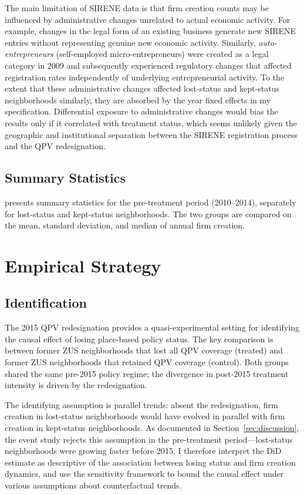 \documentclass[12pt]{article}
\begin{document}
The main limitation of SIRENE data is that firm creation counts may be influenced by administrative changes unrelated to actual economic activity. For example, changes in the legal form of an existing business generate new SIRENE entries without representing genuine new economic activity. Similarly, \textit{auto-entrepreneurs} (self-employed micro-entrepreneurs) were created as a legal category in 2009 and subsequently experienced regulatory changes that affected registration rates independently of underlying entrepreneurial activity. To the extent that these administrative changes affected lost-status and kept-status neighborhoods similarly, they are absorbed by the year fixed effects in my specification. Differential exposure to administrative changes would bias the results only if it correlated with treatment status, which seems unlikely given the geographic and institutional separation between the SIRENE registration process and the QPV redesignation.

\subsection{Summary Statistics}

 presents summary statistics for the pre-treatment period (2010--2014), separately for lost-status and kept-status neighborhoods. The two groups are compared on the mean, standard deviation, and median of annual firm creation.




\section{Empirical Strategy}

\subsection{Identification}

The 2015 QPV redesignation provides a quasi-experimental setting for identifying the causal effect of losing place-based policy status. The key comparison is between former ZUS neighborhoods that lost all QPV coverage (treated) and former ZUS neighborhoods that retained QPV coverage (control). Both groups shared the same pre-2015 policy regime; the divergence in post-2015 treatment intensity is driven by the redesignation.

The identifying assumption is parallel trends: absent the redesignation, firm creation in lost-status neighborhoods would have evolved in parallel with firm creation in kept-status neighborhoods. As documented in Section~\ref{sec:discussion}, the event study rejects this assumption in the pre-treatment period---lost-status neighborhoods were growing faster before 2015. I therefore interpret the DiD estimate as descriptive of the association between losing status and firm creation dynamics, and use the \citet{rambachan2023more} sensitivity framework to bound the causal effect under various assumptions about counterfactual trends.
\end{document}

